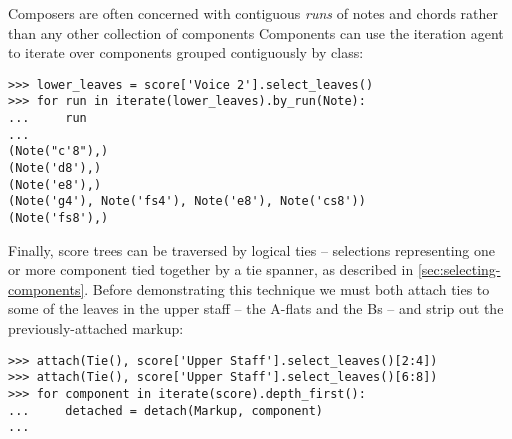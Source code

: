 \noindent Composers are often concerned with contiguous \emph{runs} of notes
and chords rather than any other collection of components Components can use
the iteration agent to iterate over components grouped contiguously by class:

\begin{comment}
<abjad>
lower_leaves = score['Voice 2'].select_leaves()
for run in iterate(lower_leaves).by_run(Note):
    run

</abjad>
\end{comment}

\begin{abjadbookoutput}
\begin{singlespacing}
\vspace{-0.5\baselineskip}
\begin{verbatim}
>>> lower_leaves = score['Voice 2'].select_leaves()
>>> for run in iterate(lower_leaves).by_run(Note):
...     run
...
(Note("c'8"),)
(Note('d8'),)
(Note('e8'),)
(Note('g4'), Note('fs4'), Note('e8'), Note('cs8'))
(Note('fs8'),)
\end{verbatim}
\end{singlespacing}
\end{abjadbookoutput}

\noindent Finally, score trees can be traversed by logical ties -- selections
representing one or more component tied together by a tie spanner, as described
in \autoref{sec:selecting-components}. Before demonstrating this technique we
must both attach ties to some of the leaves in the upper staff -- the A-flats
and the Bs -- and strip out the previously-attached markup:

\begin{comment}
<abjad>
attach(Tie(), score['Upper Staff'].select_leaves()[2:4])
attach(Tie(), score['Upper Staff'].select_leaves()[6:8])
for component in iterate(score).depth_first():
    detached = detach(Markup, component)

</abjad>
\end{comment}

\begin{abjadbookoutput}
\begin{singlespacing}
\vspace{-0.5\baselineskip}
\begin{verbatim}
>>> attach(Tie(), score['Upper Staff'].select_leaves()[2:4])
>>> attach(Tie(), score['Upper Staff'].select_leaves()[6:8])
>>> for component in iterate(score).depth_first():
...     detached = detach(Markup, component)
...
\end{verbatim}
\end{singlespacing}
\end{abjadbookoutput}

